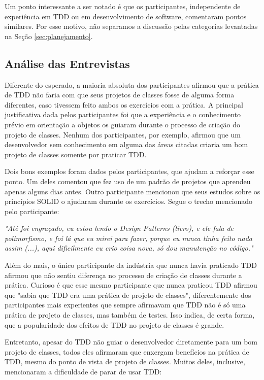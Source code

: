 \documentclass[conference]{IEEEtran}
\begin{document}
Um ponto interessante a ser notado é que os participantes, independente de experiência
em TDD ou em desenvolvimento de software, comentaram pontos similares. Por esse motivo,
não separamos a discussão pelas categorias levantadas na Seção \ref{sec:planejamento}.

\subsection{Análise das Entrevistas}

Diferente do esperado, a maioria absoluta dos participantes afirmou que 
a prática de TDD não faria com que seus projetos de classes fosse de alguma forma diferentes, caso tivessem
feito ambos os exercícios com a prática.
A principal justificativa dada pelos participantes foi que a experiência e o conhecimento prévio
em orientação a objetos os guiaram durante o processo de criação do projeto de classes. Nenhum dos
participantes, por exemplo, afirmou que um desenvolvedor sem conhecimento em alguma das áreas
citadas criaria um bom projeto de classes somente por praticar TDD.

Dois bons exemplos foram dados pelos participantes, que ajudam a reforçar esse ponto. Um deles
comentou que fez uso de um padrão de projetos \cite{gof} que aprendeu apenas alguns dias antes.
Outro participante mencionou que seus estudos sobre os princípios SOLID
o ajudaram durante os exercícios. Segue o trecho mencionado pelo participante:

\begin{framed}
\textit{"Até foi engraçado, eu estou lendo o Design Patterns (livro), e ele fala de polimorfismo, e foi
lá que eu mirei para fazer, porque eu nunca tinha feito nada assim (...), aqui dificilmente eu crio
coisa nova, só dou manutenção no código."}
\end{framed}

Além do mais, o único participante da indústria que nunca havia
praticado TDD afirmou que não sentiu diferença no processo de criação de classes durante
a prática.
Curioso é que esse mesmo participante que nunca praticou TDD afirmou que "sabia que TDD era uma prática de projeto de classes",
diferentemente dos participantes mais experientes que sempre afirmavam que TDD não é só uma prática de projeto de classes,
mas também de testes. Isso indica, de certa forma, que a popularidade dos efeitos de TDD no projeto de classes
é grande.

Entretanto, apesar do TDD não guiar o desenvolvedor diretamente para um bom projeto de classes,
todos eles afirmaram que enxergam benefícios na prática de TDD, mesmo do
ponto de vista de projeto de classes. Muitos deles, inclusive, mencionaram a dificuldade
de parar de usar TDD:
\end{document}
